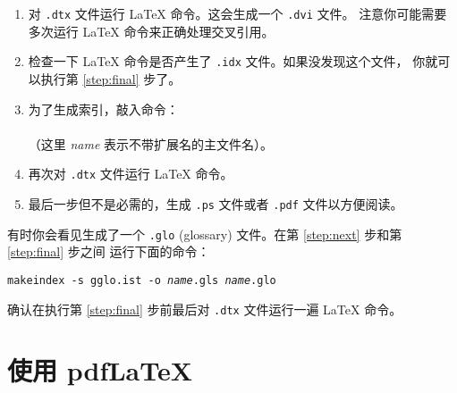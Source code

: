 \begin{enumerate}
\item 对 \texttt{.dtx} 文件运行 \LaTeX{} 命令。这会生成一个 \texttt{.dvi} 文件。
      注意你可能需要多次运行 \LaTeX{} 命令来正确处理交叉引用。
\item 检查一下 \LaTeX{} 命令是否产生了 \texttt{.idx} 文件。如果没发现这个文件，
      你就可以执行第 \ref{step:final} 步了。
\item 为了生成索引，敲入命令：\\
      \\
      （这里 \textit{name} 表示不带扩展名的主文件名）。
\item 再次对 \texttt{.dtx} 文件运行 \LaTeX{} 命令。\label{step:next}
\item 最后一步但不是必需的，生成 \texttt{.ps} 文件或者 \texttt{.pdf} 文件以方便阅读。\label{step:final}

\end{enumerate}


有时你会看见生成了一个 \texttt{.glo}
(glossary) 文件。在第 \ref{step:next} 步和第 \ref{step:final} 步之间
运行下面的命令：

\noindent\texttt{makeindex -s gglo.ist -o \textit{name}.gls \textit{name}.glo}


\noindent
确认在执行第 \ref{step:final} 步前最后对 \texttt{.dtx} 文件运行一遍 \LaTeX{} 命令。



\section{使用 pdf\LaTeX} \label{sec:pdftex}
%


